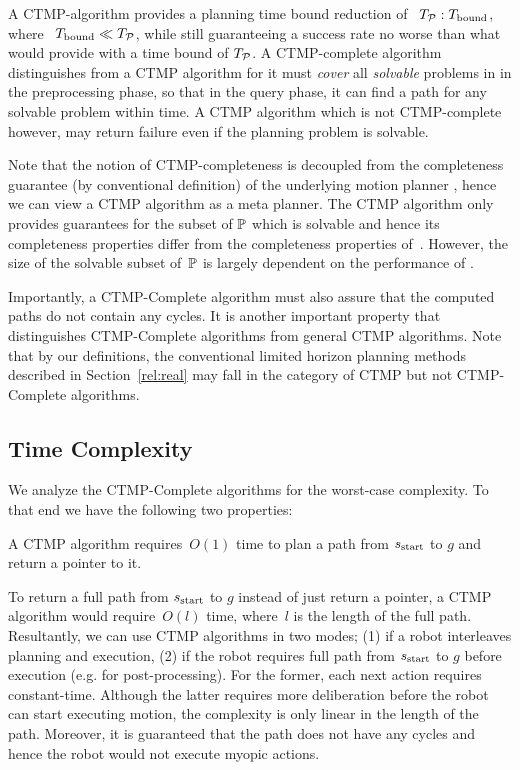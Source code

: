 \documentclass[a4paper]{report}
\begin{document}
A CTMP-algorithm provides a planning time bound reduction of ~$T_\mathcal{P} : T_{\textrm{bound}}$, where ~$T_{\textrm{bound}} \ll T_\textrm{\ensuremath{\mathcal{P}}}$, while still guaranteeing a success rate no worse than what \calP would provide with a time bound of $T_\mathcal{P}$.
%
A CTMP-complete algorithm distinguishes from a CTMP algorithm for it must \emph{cover} all \emph{solvable} problems in \pset  in the preprocessing phase, so that in the query phase, it can find a path for any solvable problem within \Tbound time. A CTMP algorithm which is not CTMP-complete however, may return failure even if the planning problem is solvable.
%

Note that the notion of CTMP-completeness is decoupled from the completeness guarantee (by conventional definition) of the underlying motion planner \calP, hence we can view a CTMP algorithm as a meta planner. The CTMP algorithm only provides guarantees for the subset of $\mathbb{P}$ which is solvable and hence its completeness properties differ from the completeness properties of~\calP. However, the size of the solvable subset of~$\mathbb{P}$ is largely dependent on the performance of \calP.

Importantly, a CTMP-Complete algorithm must also assure that the computed paths do not contain any cycles. It is another important property that distinguishes CTMP-Complete algorithms from general CTMP algorithms. Note that by our definitions, the conventional limited horizon planning methods described in Section~\ref{rel:real} may fall in the category of CTMP but not CTMP-Complete algorithms. 

\subsection{Time Complexity}
We analyze the CTMP-Complete algorithms for the worst-case complexity. To that end we have the following two properties:

\vspace{2mm}
\begin{property}
\label{ctmp:prop1}
A CTMP algorithm requires~$O(1)$ time to plan a path from $s_{\text{start}}$ to $g$ and return a pointer to it.
\end{property}

%

To return a full path from $s_{\text{start}}$ to $g$ instead of just return a pointer, a CTMP algorithm would require~$O(l)$ time, where~$l$ is the length of the full path.
Resultantly, we can use CTMP algorithms in two modes; (1) if a robot interleaves planning and execution, (2) if the robot requires full path from $s_{\text{start}}$ to $g$ before execution (e.g. for post-processing). For the former, each next action requires constant-time. Although the latter requires more deliberation before the robot can start executing motion, the complexity is only linear in the length of the path. Moreover, it is guaranteed that the path does not have any cycles and hence the robot would not execute myopic actions. 
\end{document}

